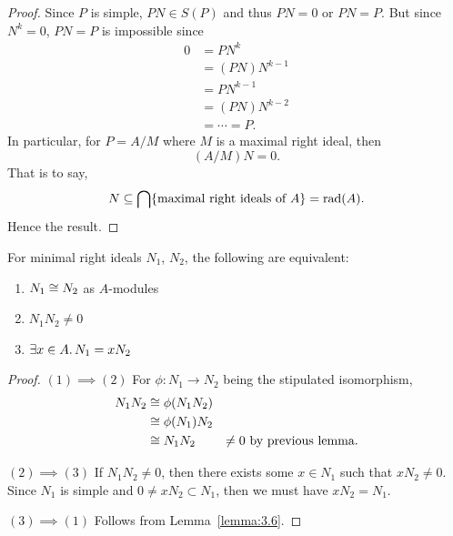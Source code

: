 \begin{proof}
Since $P$ is simple, $PN\in S(P)$ and thus $PN=0$ or $PN=P$. But since
$N^{k}=0$, $PN=P$ is impossible since
\begin{subequations}
  \begin{align}
0 &= PN^{k}\\
&= (PN)N^{k-1}\\
&= PN^{k-1}\\
&= (PN)N^{k-2}\\
&=\cdots=P.
  \end{align}
\end{subequations}
In particular, for $P=A/M$ where $M$ is a maximal right ideal, then
\begin{equation}
(A/M)N=0.
\end{equation}
That is to say,
\begin{equation}
N\subseteq\bigcap\{\mbox{maximal right ideals of }A\}=\operatorname{rad}(A).
\end{equation}
Hence the result.
\end{proof}

\begin{proposition}\label{prop:3.8}
For minimal right ideals $N_{1}$, $N_{2}$, the following are equivalent:
\begin{enumerate}
\item $N_{1}\cong N_{2}$ as $A$-modules
\item $N_{1}N_{2}\neq0$
\item $\exists x\in A\ldotp N_{1}=xN_{2}$
\end{enumerate}
\end{proposition}

\begin{proof}
$(1)\implies(2)$ For $\phi\colon N_{1}\to N_{2}$ being the stipulated isomorphism,
\begin{subequations}
  \begin{align}
N_{1}N_{2} &\cong\phi(N_{1}N_{2})\\
&\cong\phi(N_{1})N_{2}\\
&\cong N_{1}N_{2}
&\neq0\mbox{ by previous lemma.}
  \end{align}
\end{subequations}

$(2)\implies(3)$ If $N_{1}N_{2}\neq0$, then there exists some $x\in N_{1}$
such that $xN_{2}\neq0$. Since $N_{1}$ is simple and $0\neq xN_{2}\subset N_{1}$,
then we must have $xN_{2}=N_{1}$.

$(3)\implies(1)$ Follows from Lemma~\ref{lemma:3.6}.
\end{proof}

